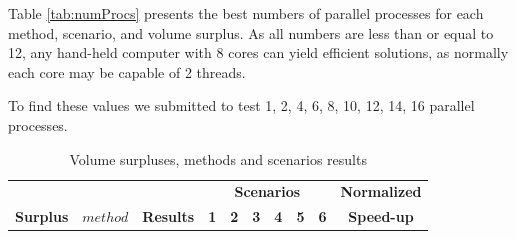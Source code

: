 \documentclass[preprint,authoryear]{elsarticle}
\begin{document}
Table \ref{tab:numProcs} presents the best numbers of parallel processes for each method, scenario, and volume surplus. As all numbers are less than or equal to 12, any hand-held computer with 8 cores can yield efficient solutions, as normally each core may be capable of 2 threads.

To find these values we submitted to test 1, 2, 4, 6, 8, 10, 12, 14, 16 parallel processes.


\vspace{2.0mm}

\begin{table}[H]
	\centering
	\caption{Volume surpluses, methods and scenarios results}  \label{tab:results}
	\footnotesize
	\begin{tabular}{cccccccccc}
		\toprule
		              &            &                  &\multicolumn{6}{c}{\bf Scenarios}              &{\bf Normalized}\\
		\cmidrule{4-9}		
		{\bf Surplus} & {$method$} &{\bf Results}     &{\bf 1}&{\bf 2}&{\bf 3}&{\bf 4}&{\bf 5}&{\bf 6}&{\bf Speed-up} \\
		\toprule



\end{tabular}
\end{table}
\end{document}
